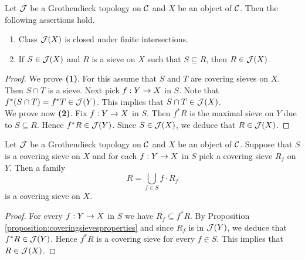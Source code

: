 \begin{proposition}\label{proposition:coveringsievesproperties}
Let ${\mathcal J}$ be a Grothendieck topology on ${\mathcal C}$ and $X$ be an object of ${\mathcal C}$. Then the following assertions hold.
\begin{enumerate}[label=\emph{\textbf{(\arabic*)}}, leftmargin=1.5em]
\item Class ${\mathcal J}(X)$ is closed under finite intersections.
\item If $S\in {\mathcal J}(X)$ and $R$ is a sieve on $X$ such that $S\subseteq R$, then $R\in {\mathcal J}(X)$.
\end{enumerate}
\end{proposition}
\begin{proof}
We prove \textbf{(1)}. For this assume that $S$ and $T$ are covering sieves on $X$. Then $S\cap T$ is a sieve. Next pick $f:Y\rightarrow X$ in $S$. Note that $f^*(S\cap T)=f^*T\in {\mathcal J}(Y)$. This implies that $S\cap T\in {\mathcal J}(X)$.\\
We prove now \textbf{(2)}. Fix $f:Y\rightarrow X$ in $S$. Then $f^*R$ is the maximal sieve on $Y$ due to $S\subseteq R$. Hence $f^*R\in {\mathcal J}(Y)$. Since $S\in {\mathcal J}(X)$, we deduce that $R\in {\mathcal J}(X)$.
\end{proof}

\begin{fact}\label{fact:compositionofcoveringsieves}
Let ${\mathcal J}$ be a Grothendieck topology on ${\mathcal C}$ and $X$ be an object of ${\mathcal C}$. Suppose that $S$ is a covering sieve on $X$ and for each $f:Y\rightarrow X$ in $S$ pick a covering sieve $R_f$ on $Y$. Then a family
$$R=\bigcup_{f\in S}f\cdot R_f$$ 
is a covering sieve on $X$.
\end{fact}
\begin{proof}
For every $f:Y\rightarrow X$ in $S$ we have $R_f\subseteq f^*R$. By Proposition \ref{proposition:coveringsievesproperties} and since $R_f$ is in ${\mathcal J}(Y)$, we deduce that $f^*R\in {\mathcal J}(Y)$. Hence $f^*R$ is a covering sieve for every $f\in S$. This implies that $R\in {\mathcal J}(X)$.
\end{proof}

